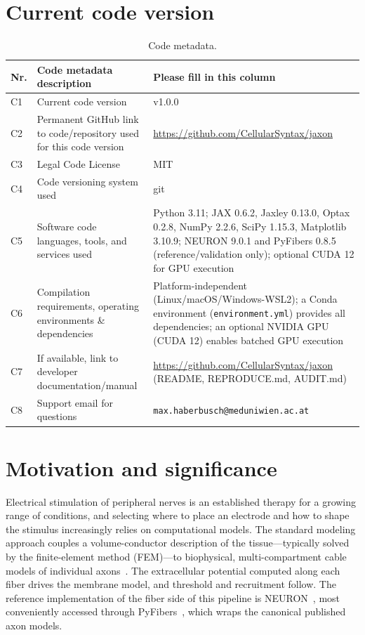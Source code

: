 \documentclass[preprint,12pt,a4paper]{elsarticle}
\begin{document}
\section*{Current code version}

\begin{table}[!h]
\begin{tabular}{|l|p{6.0cm}|p{6.0cm}|}
\hline
\textbf{Nr.} & \textbf{Code metadata description} & \textbf{Please fill in this column} \\
\hline
C1 & Current code version & v1.0.0 \\
\hline
C2 & Permanent GitHub link to code/repository used for this code version & \url{https://github.com/CellularSyntax/jaxon} \\
\hline
C3 & Legal Code License   & MIT \\
\hline
C4 & Code versioning system used & git \\
\hline
C5 & Software code languages, tools, and services used & Python 3.11; JAX 0.6.2, Jaxley 0.13.0, Optax 0.2.8, NumPy 2.2.6, SciPy 1.15.3, Matplotlib 3.10.9; NEURON 9.0.1 and PyFibers 0.8.5 (reference/validation only); optional CUDA 12 for GPU execution \\
\hline
C6 & Compilation requirements, operating environments \& dependencies & Platform-independent (Linux/macOS/Windows-WSL2); a Conda environment (\texttt{environment.yml}) provides all dependencies; an optional NVIDIA GPU (CUDA 12) enables batched GPU execution \\
\hline
C7 & If available, link to developer documentation/manual & \url{https://github.com/CellularSyntax/jaxon} (README, REPRODUCE.md, AUDIT.md) \\
\hline
C8 & Support email for questions & \nolinkurl{max.haberbusch@meduniwien.ac.at} \\
\hline
\end{tabular}
\caption{Code metadata.}
\label{tab:meta}
\end{table}

\section{Motivation and significance}

Electrical stimulation of peripheral nerves is an established therapy for a growing range of
conditions, and selecting where to place an electrode and how to shape the stimulus
increasingly relies on computational models. The standard modeling approach couples a
volume-conductor description of the tissue---typically solved by the finite-element method
(FEM)---to biophysical, multi-compartment cable models of individual
axons~\cite{mcneal,mcintyre}. The extracellular potential computed along each fiber drives
the membrane model, and threshold and recruitment follow. The reference implementation of
the fiber side of this pipeline is NEURON~\cite{neuron}, most conveniently accessed through
PyFibers~\cite{pyfibers}, which wraps the canonical published axon models.
\end{document}
